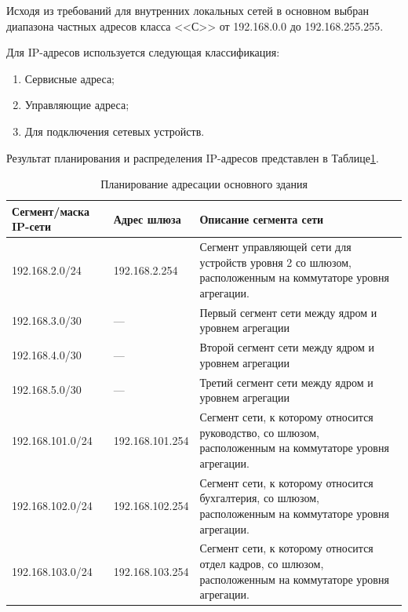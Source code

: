 Исходя из требований для внутренних локальных сетей в основном  выбран диапазона частных адресов класса <<С>> от 192.168.0.0 до 192.168.255.255.

Для IP-адресов используется следующая классификация:

\begin{enumerate}
		\item Сервисные адреса;
		\item Управляющие адреса;
		\item Для подключения сетевых устройств.
\end{enumerate}

Результат планирования и распределения IP-адресов представлен в Таблице\;\ref{table:plan_ip_oz}. 

\begin{table}[H]
\centering
{}
\caption{Планирование адресации основного здания}\label{table:plan_ip_oz}
\small
\begin{tabularx}{\textwidth}{|X|X|X|}
    \hline
	Сегмент/маска IP-сети	&	Адрес шлюза		&	Описание сегмента сети 		\\ \hline
	192.168.2.0/24			&	192.168.2.254	&	Сегмент управляющей сети для устройств уровня 2 со шлюзом, расположенным на коммутаторе уровня агрегации.				\\ \hline
	192.168.3.0/30			&		---			&	Первый сегмент сети между ядром и уровнем агрегации																		\\ \hline
	192.168.4.0/30			&		---			&	Второй сегмент сети между ядром и уровнем агрегации																		\\ \hline
	192.168.5.0/30			&		---			&	Третий сегмент сети между ядром и уровнем агрегации																		\\ \hline
	192.168.101.0/24			&	192.168.101.254	& Сегмент сети, к которому относится руководство, со шлюзом, расположенным на коммутаторе уровня агрегации. 			\\ \hline
	192.168.102.0/24			&	192.168.102.254	& Сегмент сети, к которому относится бухгалтерия, со шлюзом, расположенным на коммутаторе уровня агрегации. 			\\ \hline
	192.168.103.0/24			&	192.168.103.254	& Сегмент сети, к которому относится отдел кадров, со шлюзом, расположенным на коммутаторе уровня агрегации. 			\\ 
\end{tabularx}
\end{table}


